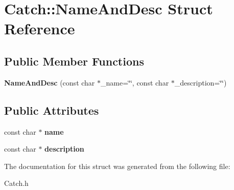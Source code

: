 \hypertarget{struct_catch_1_1_name_and_desc}{\section{Catch\-:\-:Name\-And\-Desc Struct Reference}
\label{struct_catch_1_1_name_and_desc}
}
\subsection*{Public Member Functions}
\begin{DoxyCompactItemize}
\item 
\hypertarget{struct_catch_1_1_name_and_desc_a189ceb9942fb5f6635140d6a09fc843a}{{\bfseries Name\-And\-Desc} (const char $\ast$\-\_\-name=\char`\"{}\char`\"{}, const char $\ast$\-\_\-description=\char`\"{}\char`\"{})}\label{struct_catch_1_1_name_and_desc_a189ceb9942fb5f6635140d6a09fc843a}

\end{DoxyCompactItemize}
\subsection*{Public Attributes}
\begin{DoxyCompactItemize}
\item 
\hypertarget{struct_catch_1_1_name_and_desc_a374b4ed8be3cf98be20ebde5273bde51}{const char $\ast$ {\bfseries name}}\label{struct_catch_1_1_name_and_desc_a374b4ed8be3cf98be20ebde5273bde51}

\item 
\hypertarget{struct_catch_1_1_name_and_desc_a3463a23ff65ce494fc380452b57b7970}{const char $\ast$ {\bfseries description}}\label{struct_catch_1_1_name_and_desc_a3463a23ff65ce494fc380452b57b7970}

\end{DoxyCompactItemize}


The documentation for this struct was generated from the following file\-:\begin{DoxyCompactItemize}
\item 
Catch.\-h\end{DoxyCompactItemize}
